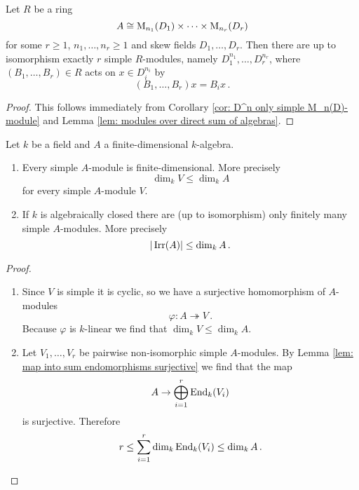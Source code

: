 \begin{cor}\label{cor: simple modules over product of matrix algebras}
  Let $R$ be a ring
  \[
                  A
    \cong         \operatorname{M}_{n_1}(D_1)
          \times  \dotsb
          \times  \operatorname{M}_{n_r}(D_r)
  \]
  for some $r \geq 1$, $n_1, \dotsc, n_r \geq 1$ and skew fields $D_1, \dotsc, D_r$.
  Then there are up to isomorphism exactly $r$ simple $R$-modules, namely $D_1^{n_1}, \dotsc, D_r^{n_r}$, where $(B_1, \dotsc, B_r) \in R$ acts on $x \in D_i^{n_i}$ by
  \[
      (B_1, \dotsc, B_r) x
    =  B_i x \,.
  \]
\end{cor}
\begin{proof}
  This follows immediately from Corollary \ref{cor: D^n only simple M_n(D)-module} and Lemma \ref{lem: modules over direct sum of algebras}.
\end{proof}


\begin{prop}\label{prop: simple modules over finite-dimensional algebras}
  Let $k$ be a field and $A$ a finite-dimensional $k$-algebra.
  \begin{enumerate}[label=\emph{\alph*)},leftmargin=*]
    \item
      Every simple $A$-module is finite-dimensional.
      More precisely
      \[
        \dim_k V \leq \dim_k A
      \]
      for every simple $A$-module $V$.
    \item
      If $k$ is algebraically closed there are (up to isomorphism) only finitely many simple $A$-modules. More precisely
      \[
        |\operatorname{Irr}(A)| \leq \dim_k A \,.
      \]
  \end{enumerate}
\end{prop}
\begin{proof}
  \begin{enumerate}[label=\emph{\alph*)},leftmargin=*]
    \item
      Since $V$ is simple it is cyclic, so we have a surjective homomorphism of $A$-modules
      \[
                            \varphi
        \colon              A
        \twoheadrightarrow  V \,.
      \]
      Because $\varphi$ is $k$-linear we find that $\dim_k V \leq \dim_k A$.
    \item
      Let $V_1, \dotsc, V_r$ be pairwise non-isomorphic simple $A$-modules. By Lemma \ref{lem: map into sum endomorphisms surjective} we find that the map
      \[
            A
        \to \bigoplus_{i=1}^r \operatorname{End}_k(V_i)
      \]
      is surjective. Therefore
      \[
              r
        \leq  \sum_{i=1}^r \dim_k \operatorname{End}_k(V_i)
        \leq  \dim_k A \,.
        \qedhere
      \]
  \end{enumerate}
\end{proof}


